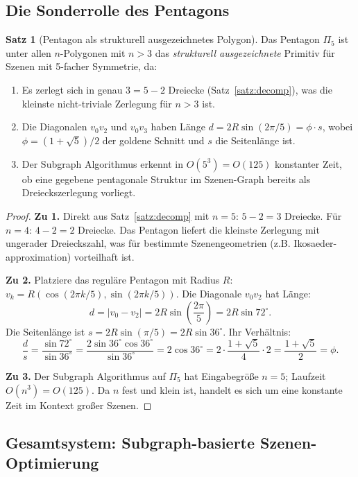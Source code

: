 ﻿\documentclass[a4paper,12pt]{article}
\theoremstyle{definition}
\newtheorem{satz}{Satz}[section]
\newcommand{\abs}[1]{\left|#1\right|}
\begin{document}
\subsection{Die Sonderrolle des Pentagons}

\begin{satz}[Pentagon als strukturell ausgezeichnetes Polygon]
\label{satz:pentagon}
Das Pentagon $\Pi_5$ ist unter allen $n$-Polygonen mit $n > 3$ das
\emph{strukturell ausgezeichnete} Primitiv f\"ur Szenen mit
5-facher Symmetrie, da:
\begin{enumerate}
	\item Es zerlegt sich in genau $3 = 5 - 2$ Dreiecke (Satz~\ref{satz:decomp}),
	      was die kleinste nicht-triviale Zerlegung f\"ur $n > 3$ ist.
	\item Die Diagonalen $v_0 v_2$ und $v_0 v_3$ haben L\"ange
	      $d = 2R\sin(2\pi/5) = \phi \cdot s$, wobei $\phi = (1+\sqrt{5})/2$
	      der goldene Schnitt und $s$ die Seitenl\"ange ist.
	\item Der Subgraph Algorithmus erkennt in $O(5^3) = O(125)$ konstanter
	      Zeit, ob eine gegebene pentagonale Struktur im Szenen-Graph
	      bereits als Dreieckszerlegung vorliegt.
\end{enumerate}
\end{satz}

\begin{proof}
\textbf{Zu 1.} Direkt aus Satz~\ref{satz:decomp} mit $n = 5$:
$5 - 2 = 3$ Dreiecke. F\"ur $n = 4$: $4 - 2 = 2$ Dreiecke. Das Pentagon
liefert die kleinste Zerlegung mit ungerader Dreieckszahl, was f\"ur
bestimmte Szenengeometrien (z.B. Ikosaeder-approximation) vorteilhaft ist.

\textbf{Zu 2.} Platziere das regul\"are Pentagon mit Radius $R$:
$v_k = R(\cos(2\pi k/5), \sin(2\pi k/5))$.
Die Diagonale $v_0 v_2$ hat L\"ange:
\[
	d = \abs{v_0 - v_2} = 2R\sin\!\left(\frac{2\pi}{5}\right) = 2R\sin 72^\circ.
\]
Die Seitenl\"ange ist $s = 2R\sin(\pi/5) = 2R\sin 36^\circ$.
Ihr Verh\"altnis:
\[
	\frac{d}{s} = \frac{\sin 72^\circ}{\sin 36^\circ} = \frac{2\sin 36^\circ\cos 36^\circ}{\sin 36^\circ}
	= 2\cos 36^\circ = 2 \cdot \frac{1+\sqrt{5}}{4} \cdot 2 = \frac{1+\sqrt{5}}{2} = \phi.
\]

\textbf{Zu 3.} Der Subgraph Algorithmus auf $\Pi_5$ hat Eingabegr\"o\ss{}e
$n = 5$; Laufzeit $O(n^3) = O(125)$. Da $n$ fest und klein ist,
handelt es sich um eine konstante Zeit im Kontext gro\ss{}er Szenen.
\end{proof}

\subsection{Gesamtsystem: Subgraph-basierte Szenen-Optimierung}
\end{document}
